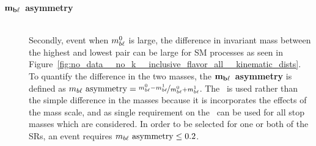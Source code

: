 \begin{description}
  \item[$\mathbf{m_{b\ell}}$~\textbf{asymmetry}] \hfill \\
    Secondly, event when $m_{b\ell}^{0}$ is large, the difference in invariant mass
    between the highest and lowest pair can be large for SM processes as seen
    in 
    Figure~\ref{fig:no_data__no_k__inclusive_flavor_all__kinematic_dists}.
    To quantify the difference in the two masses, the
    $\mathbf{m_{b\ell}}$~\textbf{asymmetry} is defined as
    $m_{b\ell}~\mathrm{asymmetry} = \nicefrac{m_{b\ell}^0-m_{b\ell}^1}{m_{b\ell}^0+m_{b\ell}^1}$.
    The \MBLASYM\ is used rather than the simple difference in the masses
    because it is incorporates the effects of the mass scale, and as single
    requirement on the \MBLASYM\ can be used for all stop masses which are
    considered.
    In order to be selected for one or both of the SRs, an event requires
    $m_{b\ell}~\mathrm{asymmetry} \leq 0.2$.
\end{description}



